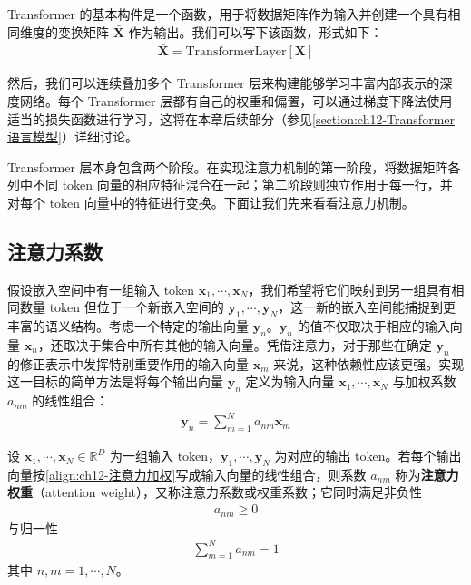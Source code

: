 \documentclass[../../main.tex]{subfiles}
\begin{document}
Transformer 的基本构件是一个函数，用于将数据矩阵作为输入并创建一个具有相同维度的变换矩阵 $\bar{\mathbf{X}}$ 作为输出。我们可以写下该函数，形式如下：
\begin{align}
\bar{\mathbf{X}}=\mathrm{TransformerLayer}[\mathbf{X}]
\label{align:ch12-Transformer层}
\end{align}

然后，我们可以连续叠加多个 Transformer 层来构建能够学习丰富内部表示的深度网络。每个 Transformer 层都有自己的权重和偏置，可以通过梯度下降法使用适当的损失函数进行学习，这将在本章后续部分（参见\cref{section:ch12-Transformer语言模型}）详细讨论。

Transformer 层本身包含两个阶段。在实现注意力机制的第一阶段，将数据矩阵各列中不同 token 向量的相应特征混合在一起；第二阶段则独立作用于每一行，并对每个 token 向量中的特征进行变换。下面让我们先来看看注意力机制。

\subsection{注意力系数}\label{subsection:ch12-注意力系数}

假设嵌入空间中有一组输入 token $\mathbf{x}_1,\cdots,\mathbf{x}_N$，我们希望将它们映射到另一组具有相同数量 token 但位于一个新嵌入空间的 $\mathbf{y}_1,\cdots,\mathbf{y}_N$，这一新的嵌入空间能捕捉到更丰富的语义结构。考虑一个特定的输出向量 $\mathbf{y}_n$。$\mathbf{y}_n$ 的值不仅取决于相应的输入向量 $\mathbf{x}_n$，还取决于集合中所有其他的输入向量。凭借注意力，对于那些在确定 $\mathbf{y}_n$ 的修正表示中发挥特别重要作用的输入向量 $\mathbf{x}_m$ 来说，这种依赖性应该更强。实现这一目标的简单方法是将每个输出向量 $\mathbf{y}_n$ 定义为输入向量 $\mathbf{x}_1,\cdots,\mathbf{x}_N$ 与加权系数 $a_{nm}$ 的线性组合：
\begin{align}
\mathbf{y}_n=\sum_{m=1}^{N}a_{nm}\mathbf{x}_m
\label{align:ch12-注意力加权}
\end{align}

\begin{definition}[注意力权重]\label{definition:ch12-注意力权重}
设 $\mathbf{x}_1,\cdots,\mathbf{x}_N\in\mathbb{R}^{D}$ 为一组输入 token，$\mathbf{y}_1,\cdots,\mathbf{y}_N$ 为对应的输出 token。若每个输出向量按\eqref{align:ch12-注意力加权}写成输入向量的线性组合，则系数 $a_{nm}$ 称为\textbf{注意力权重}（attention weight），又称注意力系数或权重系数；它同时满足非负性
\begin{align}
a_{nm}\geqslant0
\label{align:ch12-系数非负}
\end{align}
与归一性
\begin{align}
\sum_{m=1}^{N}a_{nm}=1
\label{align:ch12-系数归一}
\end{align}
其中 $n,m=1,\cdots,N$。
\end{definition}
\end{document}
